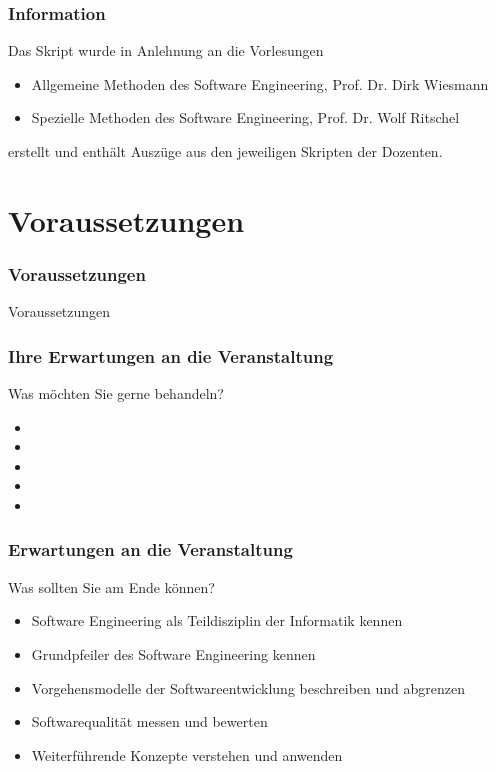 
\begin{frame}[fragile]
	\frametitle{Information}
	Das Skript wurde in Anlehnung an die Vorlesungen
	\begin{itemize}
		 \item Allgemeine Methoden des Software Engineering, Prof. Dr. Dirk Wiesmann
		 \item Spezielle Methoden des Software Engineering, Prof. Dr. Wolf Ritschel
	 \end{itemize}
	 erstellt und enthält Auszüge aus den jeweiligen Skripten der Dozenten.
\end{frame}

\section{Voraussetzungen}
\begin{frame}
	\frametitle{Voraussetzungen}
\huge Voraussetzungen
\end{frame}

\begin{frame}
\frametitle{Ihre Erwartungen an die Veranstaltung}
	\begin{exampleblock}{Was m\"ochten Sie gerne behandeln?}
		\begin{itemize}
			 \item{}
			 \item{}
			 \item{}
			 \item{}
			 \item{}
		\end{itemize}
	\end{exampleblock}
\end{frame}

\begin{frame}
\frametitle{Erwartungen an die Veranstaltung}
	\begin{block}{Was sollten Sie am Ende k\"onnen?}
		\begin{itemize}
			 \item{Software Engineering als Teildisziplin der Informatik kennen}
			 \item{Grundpfeiler des Software Engineering kennen}
			 \item{Vorgehensmodelle der Softwareentwicklung beschreiben und abgrenzen}
			 \item{Softwarequalität messen und bewerten}
			 \item{Weiterf\"uhrende Konzepte verstehen und anwenden}
		\end{itemize}
	\end{block}
\end{frame}

